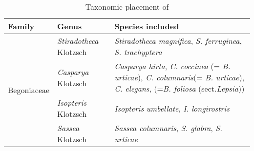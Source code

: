 \begin{table}[htbp]
  \centering
  \caption{Taxonomic placement of}
    \begin{tabular}{cll}
    \toprule
    \multicolumn{1}{l}{Family} & Genus & Species included \\
    \midrule
    \multirow{4}[8]{*}{Begoniaceae} & \textit{Stiradotheca} Klotzsch & \textit{Stiradotheca magnifica}, \textit{S. ferruginea}, \textit{S. trachyptera} \\
\cmidrule{2-3}          & \textit{Casparya} Klotzsch & \multicolumn{1}{p{37.355em}}{\textit{Casparya hirta}, \textit{C. coccinea} (= \textit{B. urticae}), \textit{C. columnaris}\newline{}(= \textit{B. urticae}), \textit{C. elegans}, (=\textit{B. foliosa} (sect.\newline{}\textit{Lepsia}))} \\
\cmidrule{2-3}          & \textit{Isopteris} Klotzsch & \textit{Isopteris} \textit{umbellate}, \textit{I. longirostris} \\
\cmidrule{2-3}          & \textit{Sassea} Klotzsch & \textit{Sassea columnaris}, \textit{S. glabra}, \textit{S. urticae} \\
    \bottomrule
    \bottomrule
    \end{tabular}%
  \label{tab:klot}%
\end{table}%
